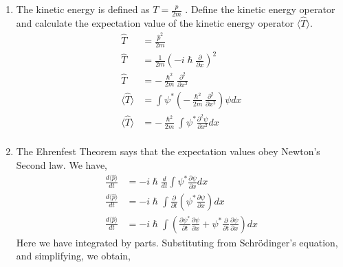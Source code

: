 \documentclass[addpoints]{exam}
\theoremstyle{mytheoremstyle}
\theoremstyle{mytheoremstyle}
\theoremstyle{myproblemstyle}
\begin{document}
\begin{questions}
\begin{solution}
\begin{enumerate}
			\item The kinetic energy is defined as \(\displaystyle T = \frac{p}{2m}\) . Define the kinetic energy operator and calculate the expectation value of the kinetic energy operator \(\langle\hat{T}\rangle\).
			      \begin{equation*}
				      \begin{aligned}
					      \hat{T}               & = \frac{\hat{p}^2}{2m}                                                                   \\
					      \hat{T}               & = \frac{1}{2m}\left(-i\hslash\frac{\partial}{\partial x}\right)^2                        \\
					      \hat{T}               & = -\frac{\hslash^2}{2m}\frac{\partial^2}{\partial x^2}                                   \\
					      \langle\hat{T}\rangle & = \int \psi^{*} \left(-\frac{\hslash^2}{2m}\frac{\partial^2}{\partial x^2}\right)\psi dx \\
					      \langle\hat{T}\rangle & = -\frac{\hslash^2}{2m}\int \psi^{*}\frac{\partial^2\psi}{\partial x^2} dx               \\
				      \end{aligned}
			      \end{equation*}
			\item The Ehrenfest Theorem\cite{ET} says that the expectation values obey Newton's Second law. We have,
			      \begin{equation*}
				      \begin{aligned}
					      \frac{d\langle\hat{p}\rangle}{dt} & = -i\hslash\frac{d}{dt}\int \psi^{*}\frac{\partial \psi}{\partial x}dx                                                                                                 \\
					      \frac{d\langle\hat{p}\rangle}{dt} & = -i\hslash\int \frac{\partial}{\partial t}\left(\psi^{*}\frac{\partial \psi}{\partial x}\right)dx                                                                     \\
					      \frac{d\langle\hat{p}\rangle}{dt} & = -i\hslash\int \left(\frac{\partial \psi^{*}}{\partial t}\frac{\partial \psi}{\partial x}+\psi^{*}\frac{\partial}{\partial t}\frac{\partial\psi}{\partial x}\right)dx
				      \end{aligned}
			      \end{equation*}
			      Here we have integrated by parts. Substituting from Schrödinger's equation, and simplifying, we obtain,
			      \begin{equation*}

\end{equation*}
\end{enumerate}
\end{solution}
\end{questions}
\end{document}
